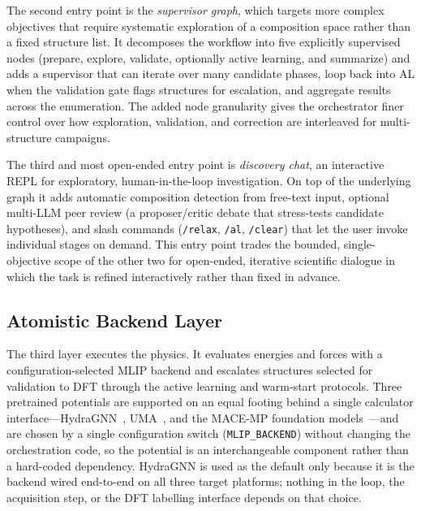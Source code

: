 \documentclass[conference]{IEEEtran}
\def\ac#1{#1}%
\def\acs#1{#1}%
\begin{document}
The second entry point is the \emph{supervisor graph}, which targets more
complex objectives that require systematic exploration of a composition space
rather than a fixed structure list. It decomposes the workflow into five
explicitly supervised nodes (prepare, explore, validate, optionally active
learning, and summarize) and adds a supervisor that can iterate over many
candidate phases, loop back into \acs{AL} when the validation gate flags
structures for escalation, and aggregate results across the enumeration. The added
node granularity gives the orchestrator finer control over how exploration,
validation, and correction are interleaved for multi-structure campaigns.

The third and most open-ended entry point is \emph{discovery chat}, an
interactive \ac{REPL} for exploratory, human-in-the-loop investigation. On top
of the underlying graph it adds automatic composition detection from
free-text input, optional multi-\acs{LLM} peer review (a proposer/critic debate
that stress-tests candidate hypotheses), and slash commands (\texttt{/relax},
\texttt{/al}, \texttt{/clear}) that let the user invoke individual stages on
demand. This entry point trades the bounded, single-objective scope of the
other two for open-ended, iterative scientific dialogue in which the task is
refined interactively rather than fixed in advance.

\subsection{Atomistic Backend Layer}
The third layer executes the physics. It evaluates energies and forces with a
configuration-selected \acs{MLIP} backend and escalates structures selected for
validation to \acs{DFT} through the active learning and warm-start protocols.
Three pretrained potentials are supported on an equal footing behind a single
calculator interface---HydraGNN~\cite{hydragnn,lupopasini2026exascalegfm},
UMA~\cite{wood2025uma}, and the MACE-MP foundation
models~\cite{batatia2022,batatia2023macemp}---and are chosen by a single
configuration switch (\texttt{MLIP\_BACKEND}) without changing the orchestration
code, so the potential is an interchangeable component rather than a hard-coded
dependency. HydraGNN is used as the default only because it is the backend wired
end-to-end on all three target platforms; nothing in the loop, the acquisition
step, or the \acs{DFT} labelling interface depends on that choice.
\end{document}
